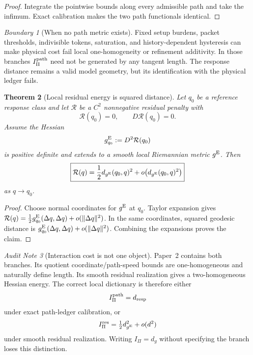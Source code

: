 \documentclass[11pt]{article}
\newtheorem{theorem}{Theorem}[section]
\theoremstyle{remark}
\newtheorem{warning}[theorem]{Boundary}
\newtheorem{audit}[theorem]{Audit Note}
\newcommand{\dresp}{d_{\rm resp}}
\begin{document}
\begin{proof}
Integrate the pointwise bounds along every admissible path and take the infimum.  Exact calibration makes the two path functionals identical.
\end{proof}

\begin{warning}[When no path metric exists]
Fixed setup burdens, packet thresholds, indivisible tokens, saturation, and history-dependent hysteresis can make physical cost fail local one-homogeneity or refinement additivity.  In those branches $I_\Pi^{\rm path}$ need not be generated by any tangent length.  The response distance remains a valid model geometry, but its identification with the physical ledger fails.
\end{warning}

\begin{theorem}[Local residual energy is squared distance]
\label{thm:residual-energy-distance}
Let $q_0$ be a reference response class and let $\mathcal R$ be a $C^2$ nonnegative residual penalty with
\[
        \mathcal R(q_0)=0,
        \qquad
        D\mathcal R(q_0)=0.
\]
Assume the Hessian
\[
        g^{\rm E}_{q_0}:=D^2\mathcal R(q_0)
\]
is positive definite and extends to a smooth local Riemannian metric $g^{\rm E}$.  Then
\[
        \boxed{
        \mathcal R(q)
        =\frac12 d_{g^{\rm E}}(q_0,q)^2
        +o\!\left(d_{g^{\rm E}}(q_0,q)^2\right)
        }
\]
as $q\to q_0$.
\end{theorem}

\begin{proof}
Choose normal coordinates for $g^{\rm E}$ at $q_0$.  Taylor expansion gives $\mathcal R(q)=\tfrac12 g^{\rm E}_{q_0}(\Delta q,\Delta q)+o(\|\Delta q\|^2)$.  In the same coordinates, squared geodesic distance is $g^{\rm E}_{q_0}(\Delta q,\Delta q)+o(\|\Delta q\|^2)$.  Combining the expansions proves the claim.
\end{proof}

\begin{audit}[Interaction cost is not one object]
Paper~2 contains both branches.  Its quotient coordinate/path-speed bounds are one-homogeneous and naturally define length.  Its smooth residual realization gives a two-homogeneous Hessian energy.  The correct local dictionary is therefore either
\[
        I_\Pi^{\rm path}=\dresp
\]
under exact path-ledger calibration, or
\[
        I_\Pi^{\rm res}=\tfrac12 d_{g^{\rm E}}^2+o(d^2)
\]
under smooth residual realization.  Writing $I_\Pi=d_g$ without specifying the branch loses this distinction.
\end{audit}
\end{document}
